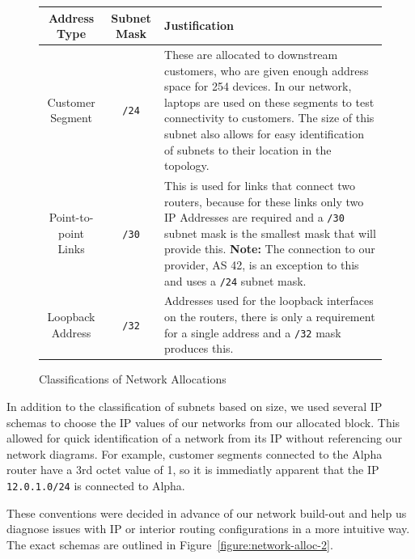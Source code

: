 \begin{figure}[!ht]
    \caption{Classifications of Network Allocations}
    \label{figure:network-alloc-1}
    \centering
    \begin{tabular}{|c|c|p{5.5cm}|}

        \hline
        \textbf{Address Type} & \textbf{Subnet Mask} & \textbf{Justification} \\

        \hline
        Customer Segment & \texttt{/24} & These are allocated to
        downstream customers, who are given enough address space for 254
        devices. In our network, laptops are used on these segments to test
        connectivity to customers. The size of this subnet also allows for easy
        identification of subnets to their location in the topology.\\

        \hline
        Point-to-point Links & \texttt{/30} & This is used for links that
        connect two routers, because for these links only two IP Addresses are
        required and a \texttt{/30} subnet mask is the smallest mask that will
        provide this. \textbf{Note:} The connection to our provider, AS 42, is
        an exception to this and uses a \texttt{/24} subnet mask.\\

        \hline
        Loopback Address & \texttt{/32} & Addresses used for the loopback
        interfaces on the routers, there is only a requirement for a single
        address and a \texttt{/32} mask produces this.\\

        \hline
    \end{tabular}
\end{figure}
In addition to the classification of subnets based on size, we used several IP
schemas to choose the IP values of our networks from our allocated block. This
allowed for quick identification of a network from its IP without referencing
our network diagrams. For example, customer segments connected to the Alpha
router have a 3rd octet value of 1, so it is immediatly apparent that the IP
\texttt{12.0.1.0/24} is connected to Alpha.

These conventions were decided in advance of our network build-out and help us
diagnose issues with IP or interior routing configurations in a more intuitive
way. The exact schemas are outlined in Figure~\ref{figure:network-alloc-2}.

